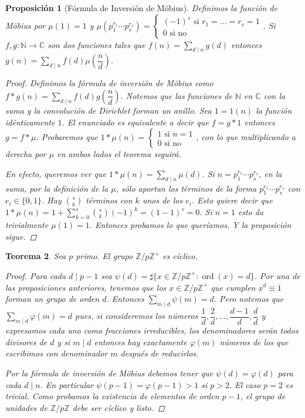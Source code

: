 \documentclass[12pt]{book}
\newtheorem{teo}{Teorema}[section]
\newtheorem{prop}[teo]{Proposición}
\theoremstyle{definition}
\newcommand{\CC}{\mathbb{C}}
\newcommand{\ZZ}{\mathbb{Z}}      %
\newcommand{\NN}{\mathbb{N}}
\DeclareMathOperator{\ord}{ord}
\begin{document}
\begin{prop}[Fórmula de Inversión de Möbius]
Definimos la función de Möbius por $\mu(1)=1$ y $\mu(p_1^{r_1}\cdots p_s^{r_s}) = \begin{cases}(-1)^s \text{ si } r_1=\ldots = r_s= 1 \\ 0 \text{ si no }\end{cases}$. Si $f,g:\NN\to \CC$ son dos funciones tales que $f(n) = \displaystyle\sum_{d\mid n} g(d)$ entonces $g(n) = \displaystyle\sum_{d\mid n}f(d)\mu\left(\dfrac{n}{d}\right)$.
\begin{proof}
Definimos la fórmula de inversión de Möbius como $f*g(n) = \displaystyle\sum_{d\mid n}f(d)g\left(\dfrac{n}{d}\right)$. Notemos que las funciones de $\NN$ en $\CC$ con la suma y la convolución de Dirichlet forman un anillo. Sea $1=1(n)$ la función idénticamente $1$. El enunciado es equivalente a decir que $f = g*1$ entonces $g = f*\mu$. Probaremos que $1*\mu(n) = \begin{cases}1 \text{ si }n=1 \\ 0 \text{ si no}\end{cases}$, con lo que multiplicando a derecha por $\mu$ en ambos lados el teorema seguirá.

En efecto, queremos ver que $1*\mu(n)= \displaystyle\sum_{d\mid n} \mu(d)$. Si $n=p_1^{r_1}\cdots p_s^{r_s}$, en la suma, por la definición de la $\mu$, sólo aportan los términos de la forma $p_1^{e_1}\cdots p_s^{e_s}$ con $e_i\in \{0,1\}$. Hay $\displaystyle\binom{s}{k}$ términos con $k$ unos de los $e_i$. Esto quiere decir que $1*\mu (n) = 1+\displaystyle\sum_{k=0}^s \binom{s}{k}(-1)^k = (1-1)^s = 0$. Si $n=1$ esto da trivialmente $\mu(1)=1$. Entonces probamos lo que queríamos. Y la proposición sigue.

\end{proof}
\end{prop}

\begin{teo}
Sea $p$ primo. El grupo $\ZZ/p\ZZ^\times$ es cíclico.
\begin{proof}
Para cada $d\mid p-1$ sea $\psi(d)=\sharp \{x\in \ZZ/p\ZZ^\times : \ord(x)=d\}$. Por una de las proposiciones anteriores, tenemos que los $x\in\ZZ/p\ZZ^\times$ que cumplen $x^d \equiv \overline{1}$ forman un grupo de orden $d$. Entonces $\displaystyle\sum_{m\mid d}\psi(m)=d$. Pero notemos que $\displaystyle\sum_{m\mid d}\varphi(m) = d$ pues, si consideremos los números $\dfrac{1}{d},\dfrac{2}{d},\ldots , \dfrac{d-1}{d},\dfrac{d}{d}$ y expresamos cada uno como fracciones irreducibles, los denominadores serán todos divisores de $d$ y si $m\mid d$ entonces hay exactamente $\varphi(m)$ números de los que escribimos con denominador $m$ después de reducirlos.

Por la fórmula de inversión de Möbius debemos tener que $\psi(d) =\varphi(d)$ para cada $d\mid n$. En particular $\psi(p-1)=\varphi(p-1)>1$ si $p>2$. El caso $p=2$ es trivial. Como probamos la existencia de elementos de orden $p-1$, el grupo de unidades de $\ZZ/p\ZZ$ debe ser cíclico y listo.
\end{proof}
\end{teo}
\end{document}
